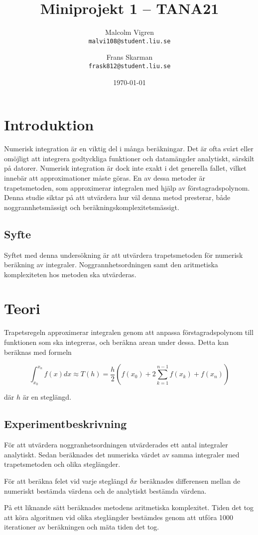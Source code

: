 \documentclass[a4paper,titlepage]{article}
\title{
    \textbf{Miniprojekt 1 -- TANA21}}
\date{\today}
\author{%
    Malcolm Vigren \\
    \texttt{malvi108@student.liu.se}
    \and
    Frans Skarman\\
    \texttt{frask812@student.liu.se}
    }
\begin{document}
\maketitle
\newpage
\tableofcontents
\newpage

\section{Introduktion}
Numerisk integration är en viktig del i många beräkningar. Det är ofta svårt
eller omöjligt att integrera godtyckliga funktioner och datamängder analytiskt,
särskilt på datorer. Numerisk integration är dock inte exakt i det generella
fallet, vilket innebär att approximationer måste göras. En av dessa metoder
är trapetsmetoden, som approximerar integralen med hjälp av förstagradspolynom.
Denna studie siktar på att utvärdera hur väl denna metod presterar,
både noggrannhetsmässigt och beräkningskomplexitetsmässigt.

\subsection{Syfte}
Syftet med denna undersökning är att utvärdera trapetsmetoden för numerisk
beräkning av integraler. Noggrannhetsordningen samt den aritmetiska
komplexiteten hos metoden ska utvärderas.

\section{Teori}
Trapetsregeln approximerar integralen genom att anpassa förstagradspolynom till
funktionen som ska integreras, och beräkna arean under dessa. Detta kan
beräknas med formeln

\begin{equation}
    \int_{x_0}^{x_n}f(x)dx \approx T(h) = \frac{h}{2}(f(x_0) +
    2\sum_{k=1}^{n-1}f(x_k) + f(x_n))
\end{equation}

där $h$ är en steglängd.

\subsection{Experimentbeskrivning}

För att utvärdera noggranhetsordningen utvärderades ett antal integraler
analytiskt. Sedan beräknades det numeriska värdet av samma integraler med
trapetsmetoden och olika steglängder.

För att beräkna felet vid varje steglängd $\delta x$ beräknades differensen mellan de numeriskt
bestämda värdena och de analytiskt bestämda värdena.


På ett liknande sätt beräknades metodens aritmetiska komplexitet. Tiden det tog att köra
algoritmen vid olika steglängder bestämdes genom att utföra 1000 iterationer av beräkningen
och mäta tiden det tog.
\end{document}
